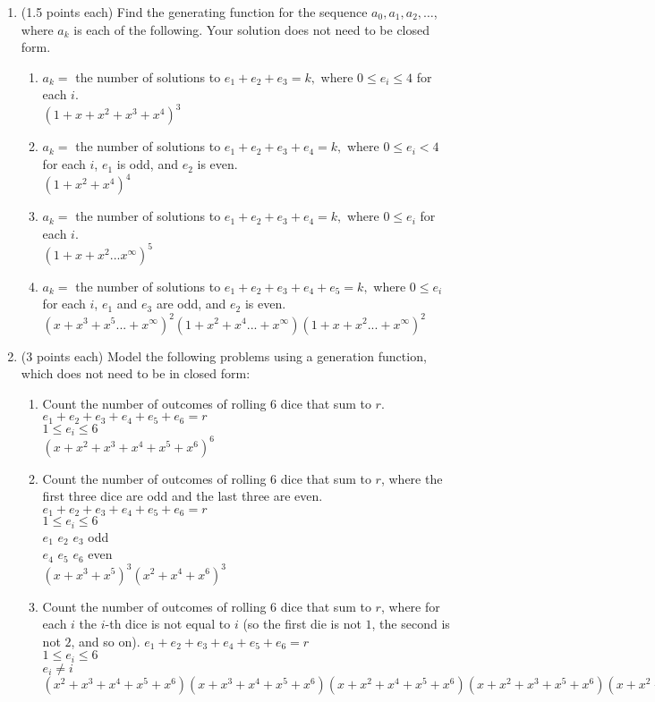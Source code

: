 \documentclass[11pt]{article}
\begin{document}
\begin{enumerate}


\item (1.5 points each) Find the generating function for the sequence
$a_0, a_1, a_2, \ldots$, where $a_k$ is each of the following.
Your solution does not need to be closed form.
\begin{enumerate}
\item $a_k = $ the number of solutions to $e_1 + e_2 + e_3 = k,$
where $0 \leq e_i \leq 4$ for each $i$.\\
$(1 + x + x^2 + x^3 + x^4)^3$
\item $a_k = $ the number of solutions to $e_1 + e_2 + e_3 + e_4 = k,$
where $0 \leq e_i < 4$ for each $i$, $e_1$ is odd, and $e_2$ is even.\\
$(1 + x^2 + x^4)^4$
\item $a_k = $ the number of solutions to $e_1 + e_2 + e_3 + e_4 = k,$
where $0 \leq e_i$ for each $i$.\\
$(1 + x + x^2 ... x^{\infty})^5$
\item $a_k = $ the number of solutions to $e_1 + e_2 + e_3 + e_4 + e_5= k,$
where $0 \leq e_i$ for each $i$, $e_1$ and $e_3$ are odd, and $e_2$
is even.\\
$(x + x^3 + x^5 ... + x^{\infty})^2(1 + x^2 + x^4 ... + x^{\infty})(1 + x +x^2 ... +
x^{\infty})^2$
\end{enumerate}

\item (3 points each) Model the following problems using a generation function,
which does not need to be in closed form:  
\begin{enumerate}
\item Count the number of outcomes of
rolling $6$ dice that sum to $r$.\\
$e_1 + e_2 + e_3 + e_4 + e_5 + e_6 = r$\\
$1 \leq e_i \leq 6$\\
$(x + x^2 + x^3 + x^4 + x^5 + x^6)^6$
\item Count the number of outcomes of rolling $6$ dice that sum to $r$,
where the first three dice are odd and the last three are even.
$e_1 + e_2 + e_3 + e_4 + e_5 + e_6 = r$\\
$1 \leq e_i \leq 6$\\
$e_1$ $e_2$ $e_3$ odd\\
$e_4$ $e_5$ $e_6$ even\\
$(x + x^3 + x^5)^3(x^2 + x^4 + x^6)^3$
\item Count the number of outcomes of rolling $6$ dice that sum to $r$,
where for each $i$ the $i$-th dice is not equal to $i$ (so
the first die is not $1$, the second is not $2$, and so on).
$e_1 + e_2 + e_3 + e_4 + e_5 + e_6 = r$\\
$1 \leq e_i \leq 6$\\
$e_i \neq i$\\
$(x^2 + x^3 + x^4 + x^5 +x^6)(x + x^3 + x^4 + x^5 + x^6)
(x + x^2 + x^4 + x^5 + x^6)(x + x^2 + x^3 + x^5 + x^6)
(x + x^2 + x^3 + x^4 + x^6)(x + x^2 + x^3 + x^4 + x^5)$


\end{enumerate}
\end{enumerate}
\end{document}
